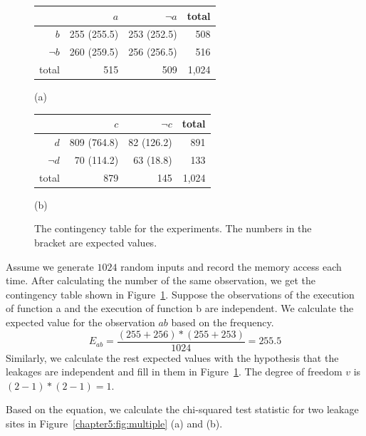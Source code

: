\begin{figure}[h]
  \begin{minipage}{0.40\linewidth}
      \begin{tabular}{rrrr}
        \toprule
        & $a$ & $\lnot a$  & total\\
        \midrule
        $b$   & 255 (255.5) & 253 (252.5) &   508  \\
        $\lnot b$   & 260 (259.5)  & 256 (256.5) &    516   \\
        total &   515 &  509   & 1,024   \\
        \bottomrule
      \end{tabular}\caption*{(a)}
  \end{minipage}
\hspace{-15pt}
\hfill
\hspace{-15pt}
  \begin{minipage}{0.40\linewidth}
      \begin{tabular}{rrrr}
        \toprule
        & $c$ & $\lnot c$  & total\\
        \midrule
        $d$   & 809 (764.8) & 82 (126.2) & 891    \\
        $\lnot d$   & 70 (114.2)  & 63 (18.8)&  133     \\
        total &  879 &  145  & 1,024    \\
        \bottomrule
      \end{tabular}\caption*{(b)}
  \end{minipage}
  \caption{The contingency table for the experiments. The numbers in the bracket are expected values. }\label{chapter5:fig:con_table}
\end{figure}


Assume we generate $1024$ random inputs and record the memory access each time.  After calculating the number of the same observation, we get the contingency table shown in Figure~\ref{chapter5:fig:con_table}. Suppose the observations of the execution of function \textsf{a} and the execution of function \textsf{b} are independent.  We calculate the expected value for the observation $ab$ based on the frequency.
\[ E_{ab} = \frac{(255+256)*(255+253)}{1024} = 255.5\]
Similarly, we calculate the rest expected values with the hypothesis that the leakages are independent and fill in them in Figure~\ref{chapter5:fig:con_table}. The degree of freedom $v$ is $(2-1)*(2-1) = 1$.

Based on the equation, we calculate the chi-squared test statistic for two leakage sites in Figure~\ref{chapter5:fig:multiple} (a) and (b).

